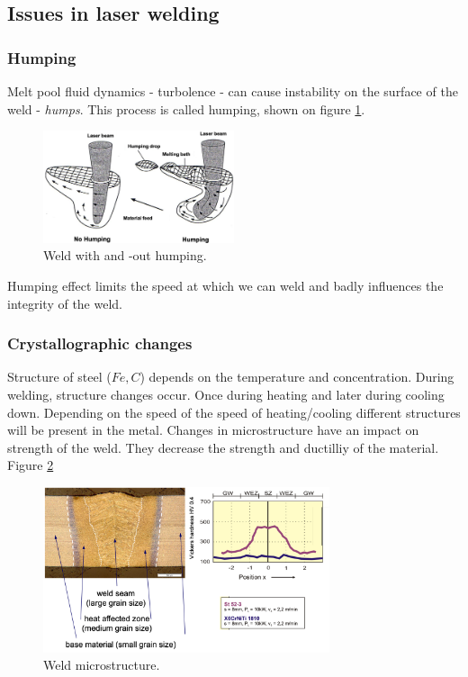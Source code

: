\subsection{Issues in laser welding}

\subsubsection{Humping}
Melt pool fluid dynamics - turbolence - can cause instability on the surface of the weld - \textit{humps}. This process
is called humping, shown on figure \ref{fig:humping}. 
\begin{figure}[h!]
    \centering
    \includegraphics[width=0.5\textwidth]{slike/humping.png}
    \caption{Weld with and -out humping. \sln}
    \label{fig:humping}
\end{figure}

Humping effect limits the speed at which we can weld and badly influences the integrity of the weld.

\subsubsection{Crystallographic changes}
Structure of steel ($Fe, C$) depends on the temperature and concentration.
During welding, structure changes occur. Once during heating and later during cooling down. 
Depending on the speed of the speed of heating/cooling different structures will be present in the metal.
Changes in microstructure have an impact on strength of the weld. They decrease the strength and ductilliy 
of the material. Figure \ref{fig:mustr}
\begin{figure}[h!]
    \centering
    \includegraphics[width=0.75\textwidth]{slike/weld_mstr.png}
    \caption{Weld microstructure. \sln}
    \label{fig:mustr}
\end{figure}
 
